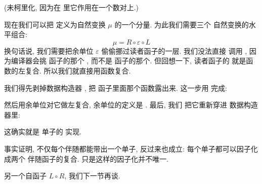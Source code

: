 (未柯里化, 因为在  里它作用在一个数对上.)

现在我们可以把  定义为自然变换 $\mu$ 的一个分量. 为此我们需要三个
自然变换的水平组合:
\[\mu = R \circ \varepsilon \circ L\]
换句话说, 我们需要把余单位 $\varepsilon$ 偷偷挪过读者函子的一层. 我们没法直接
调用 , 因为编译器会挑  函子的那个 , 而不是
 函子的那个. 但回想一下, 读者函子的  就是函数的左复合.
所以我们就直接用函数复合.

我们得先剥掉数据构造器 , 把  函子里面那个函数露出来.
这一步用  完成:

然后用余单位对它做左复合, 余单位的定义是 . 最后, 我们
把它重新穿进  数据构造器里:

这确实就是  单子的  实现.

事实证明, 不仅每个伴随都能带出一个单子, 反过来也成立: 每个单子都可以因子化成两个
伴随函子的复合. 只是这样的因子化并不唯一.

另一个自函子 $L \circ R$, 我们下一节再谈.
